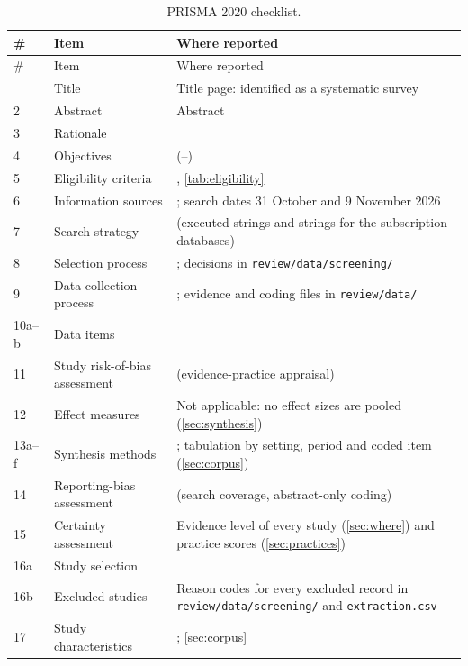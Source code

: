 \begin{small}
\setlength{\tabcolsep}{4pt}
\begin{longtable}{@{}lL{5.2cm}L{8.3cm}@{}}
\caption{PRISMA 2020 checklist.}\label{tab:prisma-checklist}\\
\toprule \# & Item & Where reported \\ \midrule \endfirsthead
\toprule \# & Item & Where reported \\ \midrule \endhead
\bottomrule {} & Title & Title page: identified as a systematic survey \\
2 & Abstract & Abstract \\
3 & Rationale &  \\
4 & Objectives &  (--) \\
5 & Eligibility criteria & , \cref{tab:eligibility} \\
6 & Information sources & ; search dates 31 October and 9 November 2026 \\
7 & Search strategy &  (executed strings and strings for the subscription databases) \\
8 & Selection process & ; decisions in \texttt{review/data/screening/} \\
9 & Data collection process & ; evidence and coding files in \texttt{review/data/} \\
10a--b & Data items &  \\
11 & Study risk-of-bias assessment &  (evidence-practice appraisal) \\
12 & Effect measures & Not applicable: no effect sizes are pooled (\cref{sec:synthesis}) \\
13a--f & Synthesis methods & ; tabulation by setting, period and coded item (\cref{sec:corpus}) \\
14 & Reporting-bias assessment &  (search coverage, abstract-only coding) \\
15 & Certainty assessment & Evidence level of every study (\cref{sec:where}) and practice scores (\cref{sec:practices}) \\
16a & Study selection &  \\
16b & Excluded studies & Reason codes for every excluded record in \texttt{review/data/screening/} and \texttt{extraction.csv} \\
17 & Study characteristics & ; \cref{sec:corpus} \\

\end{longtable}
\end{small}
